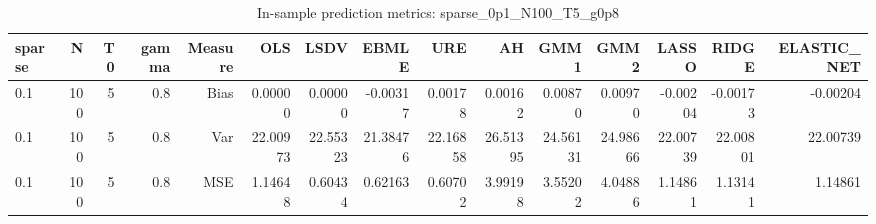 \begin{table}[!htbp]\centering
\caption{In-sample prediction metrics: sparse_0p1_N100_T5_g0p8}
\label{tab:table2_sparse_0p1_N100_T5_g0p8}
\begin{tabular}{lrrrrrrrrrrrrrr}
\hline
sparse & N & T0 & gamma & Measure & OLS & LSDV & EBMLE & URE & AH & GMM1 & GMM2 & LASSO & RIDGE & ELASTIC_NET \\
\hline
0.1 & 100 & 5 & 0.8 & Bias & 0.00000 & 0.00000 & -0.00317 & 0.00178 & 0.00162 & 0.00870 & 0.00970 & -0.00204 & -0.00173 & -0.00204 \\
0.1 & 100 & 5 & 0.8 & Var & 22.00973 & 22.55323 & 21.38476 & 22.16858 & 26.51395 & 24.56131 & 24.98666 & 22.00739 & 22.00801 & 22.00739 \\
0.1 & 100 & 5 & 0.8 & MSE & 1.14648 & 0.60434 & 0.62163 & 0.60702 & 3.99198 & 3.55202 & 4.04886 & 1.14861 & 1.13141 & 1.14861 \\
\hline
\end{tabular}
\end{table}

